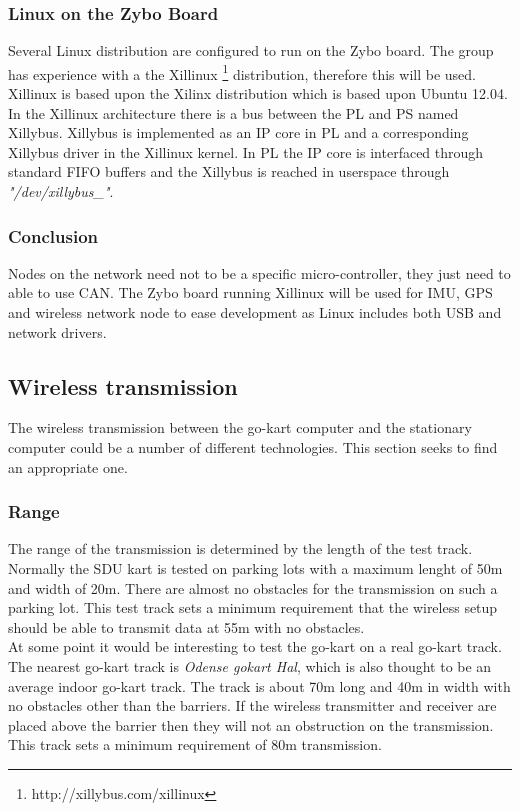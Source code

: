 \subsubsection*{Linux on the Zybo Board}
Several Linux distribution are configured to run on the Zybo board. 
The group has experience with a the Xillinux \footnote{http://xillybus.com/xillinux} distribution, therefore this will be used.
Xillinux is based upon the Xilinx distribution which is based upon Ubuntu 12.04.
In the Xillinux architecture there is a bus between the PL and PS named Xillybus.
Xillybus is implemented as an IP core in PL and a corresponding Xillybus driver in the Xillinux kernel.
In PL the IP core is interfaced through standard FIFO buffers and the Xillybus is reached in userspace through \textit{"/dev/xillybus\_"}.

\subsubsection*{Conclusion}
Nodes on the network need not to be a specific micro-controller, they just need to able to use CAN.
The Zybo board running Xillinux will be used for IMU, GPS and wireless network node to ease development as Linux includes both USB and network drivers. 



















\subsection{Wireless transmission}
The wireless transmission between the go-kart computer and the stationary computer could be a number of different technologies.
This section seeks to find an appropriate one.

\subsubsection{Range}
The range of the transmission is determined by the length of the test track. 
Normally the SDU kart is tested on parking lots with a maximum lenght of 50m and width of 20m.
There are almost no obstacles for the transmission on such a parking lot. 
This test track sets a minimum requirement that the wireless setup should be able to transmit data at 55m with no obstacles.
\\
At some point it would be interesting to test the go-kart on a real go-kart track. 
The nearest go-kart track is \textit{Odense gokart Hal}, which is also thought to be an average indoor go-kart track.
The track is about 70m long and 40m in width with no obstacles other than the barriers. 
If the wireless transmitter and receiver are placed above the barrier then they will not an obstruction on the transmission. 
This track sets a minimum requirement of 80m transmission. 

